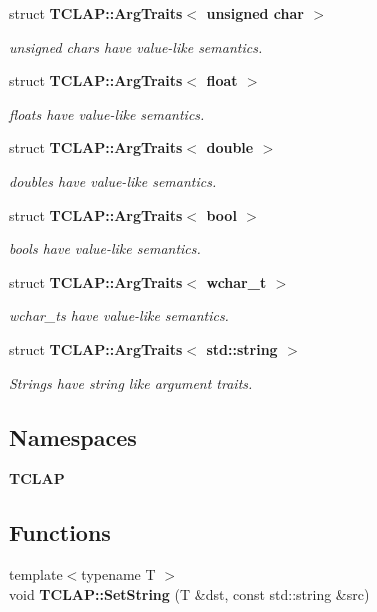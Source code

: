 \begin{DoxyCompactItemize}
struct {\bf T\+C\+L\+A\+P\+::\+Arg\+Traits$<$ unsigned char $>$}
\begin{DoxyCompactList}\small\item\em unsigned chars have value-\/like semantics. \end{DoxyCompactList}\item 
struct {\bf T\+C\+L\+A\+P\+::\+Arg\+Traits$<$ float $>$}
\begin{DoxyCompactList}\small\item\em floats have value-\/like semantics. \end{DoxyCompactList}\item 
struct {\bf T\+C\+L\+A\+P\+::\+Arg\+Traits$<$ double $>$}
\begin{DoxyCompactList}\small\item\em doubles have value-\/like semantics. \end{DoxyCompactList}\item 
struct {\bf T\+C\+L\+A\+P\+::\+Arg\+Traits$<$ bool $>$}
\begin{DoxyCompactList}\small\item\em bools have value-\/like semantics. \end{DoxyCompactList}\item 
struct {\bf T\+C\+L\+A\+P\+::\+Arg\+Traits$<$ wchar\+\_\+t $>$}
\begin{DoxyCompactList}\small\item\em wchar\+\_\+ts have value-\/like semantics. \end{DoxyCompactList}\item 
struct {\bf T\+C\+L\+A\+P\+::\+Arg\+Traits$<$ std\+::string $>$}
\begin{DoxyCompactList}\small\item\em Strings have string like argument traits. \end{DoxyCompactList}\end{DoxyCompactItemize}
\subsection*{Namespaces}
\begin{DoxyCompactItemize}
\item 
 {\bf T\+C\+L\+A\+P}
\end{DoxyCompactItemize}
\subsection*{Functions}
\begin{DoxyCompactItemize}
\item 
{\footnotesize template$<$typename T $>$ }\\void {\bf T\+C\+L\+A\+P\+::\+Set\+String} (T \&dst, const std\+::string \&src)
\end{DoxyCompactItemize}
